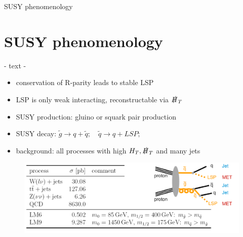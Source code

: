 

\begin{frame}{SUSY phenomenology}
	\section{SUSY phenomenology}
	\begin{block}{ - text - }
		\begin{itemize}
\item conservation of R-parity leads to stable LSP\\
\item LSP is only weak interacting, reconstructable via $\slashed{H}_T$ \\
\item SUSY production: \quad gluino or squark pair production\\
\item SUSY decay: \quad $\tilde{g} \rightarrow q +\tilde{q};\quad  \tilde{q} \rightarrow q + LSP;$\\ 
\item background: all processes with high $H_T, \slashed{H}_T$ and many jets
		\end{itemize}
	\end{block}

	\begin{figure}[H]
	\centering
	 \includegraphics[width=\textwidth,]{figures/feynman+bkg.png}
	\end{figure}
\end{frame}

